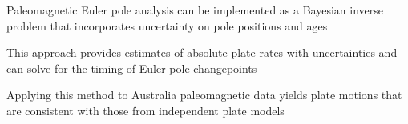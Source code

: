 \documentclass[]{agujournal2019}
\providecommand{\DIFdelbegin}{} %
\providecommand{\DIFdelend}{} %
\begin{document}


\DIFdelend {}

\DIFdelbegin %



\DIFdelend \begin{keypoints}
\item Paleomagnetic Euler pole analysis can be implemented as a Bayesian inverse problem that incorporates uncertainty on pole positions and ages
\item This approach provides estimates of absolute plate rates with uncertainties and can solve for the timing of Euler pole changepoints
\item Applying this method to Australia paleomagnetic data yields plate motions that are consistent with those from independent plate models
\end{keypoints}

\DIFdelbegin %
\end{document}

